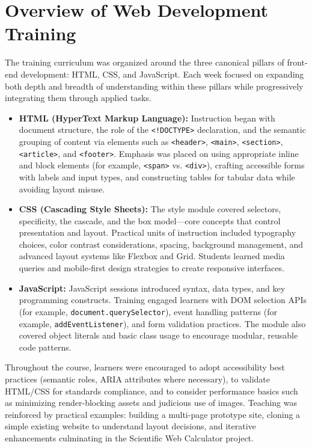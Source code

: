 \documentclass[a4paper,12pt,oneside]{report}
\numberwithin{equation}{chapter}
\numberwithin{figure}{chapter}
\numberwithin{table}{chapter}
\begin{document}
\section{Overview of Web Development Training}

The training curriculum was organized around the three canonical pillars of front-end development: HTML, CSS, and JavaScript. Each week focused on expanding both depth and breadth of understanding within these pillars while progressively integrating them through applied tasks.

\begin{itemize}
    \item \textbf{HTML (HyperText Markup Language):} Instruction began with document structure, the role of the \texttt{<!DOCTYPE>} declaration, and the semantic grouping of content via elements such as \texttt{<header>}, \texttt{<main>}, \texttt{<section>}, \texttt{<article>}, and \texttt{<footer>}. Emphasis was placed on using appropriate inline and block elements (for example, \texttt{<span>} vs. \texttt{<div>}), crafting accessible forms with labels and input types, and constructing tables for tabular data while avoiding layout misuse.
    
    \item \textbf{CSS (Cascading Style Sheets):} The style module covered selectors, specificity, the cascade, and the box model—core concepts that control presentation and layout. Practical units of instruction included typography choices, color contrast considerations, spacing, background management, and advanced layout systems like Flexbox and Grid. Students learned media queries and mobile-first design strategies to create responsive interfaces.
    
    \item \textbf{JavaScript:} JavaScript sessions introduced syntax, data types, and key programming constructs. Training engaged learners with DOM selection APIs (for example, \texttt{document.querySelector}), event handling patterns (for example, \texttt{addEventListener}), and form validation practices. The module also covered object literals and basic class usage to encourage modular, reusable code patterns.
\end{itemize}

Throughout the course, learners were encouraged to adopt accessibility best practices (semantic roles, ARIA attributes where necessary), to validate HTML/CSS for standards compliance, and to consider performance basics such as minimizing render-blocking assets and judicious use of images. Teaching was reinforced by practical examples: building a multi-page prototype site, cloning a simple existing website to understand layout decisions, and iterative enhancements culminating in the Scientific Web Calculator project.
\end{document}
